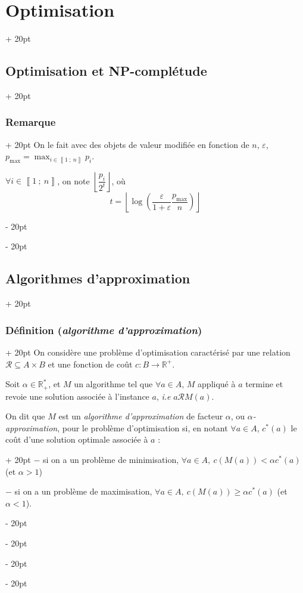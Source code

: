 \documentclass[a4paper, 12pt, twoside]{article}
\newcommand{\R}{\mathbb{R}} %
\newcommand{\nset}[2]{\left\llbracket #1\ ;\ #2 \right\rrbracket}
\newcommand{\lr}[1]{\left( #1 \right)}
\newcommand{\floor}[1]{\left\lfloor #1 \right\rfloor}
\renewcommand{\ge}{\geqslant}
\newcommand{\ind}[1][20pt]{\advance\leftskip + #1}
\newcommand{\deind}[1][20pt]{\advance\leftskip - #1}
\newenvironment{indt}[2][20pt]{#2 \par \ind[#1]}{\par \deind} %
\newcommand{\1}{\mathbbm 1}
\begin{document}
\begin{indt}{\section{Optimisation}}
\begin{indt}{\subsection{Optimisation et \textbf{NP}-complétude}}
\begin{indt}{\subsubsection{Remarque}}
                On le fait avec des objets de valeur modifiée en fonction de $n$, $\varepsilon$, $\displaystyle p_{\max} = \max_{i \in \nset 1 n} p_i$.

                $\displaystyle \forall i \in \nset 1 n$, on note $\floor{\dfrac{p_i}{2^t}}$, où
                \[
                    t = \floor{\log\!\lr{\dfrac{\varepsilon}{1 + \varepsilon} \dfrac{p_{\max}}{n}}}
                \]
            \end{indt}
        \end{indt}

        \vspace{12pt}
        
        \begin{indt}{\subsection{Algorithmes d'approximation}}
            \begin{indt}{\subsubsection{Définition (\textit{algorithme d'approximation})}}
                On considère une problème d'optimisation caractérisé par une relation $\mathcal R \subseteq A \times B$ et une fonction de coût $c : B \longrightarrow \R^+$.

                Soit $\alpha \in \R_+^*$, et $M$ un algorithme tel que $\forall a \in A$, $M$ appliqué à $a$ termine et revoie une solution associée à l'instance $a$, \textit{i.e} $a \mathcal R M(a)$.

                On dit que $M$ est un \emph{algorithme d'approximation} de facteur $\alpha$, ou \emph{$\alpha$-approximation}, pour le problème d'optimisation si, en notant $\forall a \in A$, $c^*(a)$ le coût d'une solution optimale associée à $a$ :
                \begin{indt}{}
                    $-$ si on a un problème de minimisation, $\forall a \in A,\ c(M(a)) < \alpha c^*(a)$ (et $\alpha > 1$)
                    
                    $-$ si on a un problème de maximisation, $\forall a \in A,\ c(M(a)) \ge \alpha c^*(a)$ (et $\alpha < 1$).
                \end{indt}
            \end{indt}

            \vspace{12pt}
            

\end{indt}
\end{indt}
\end{document}
